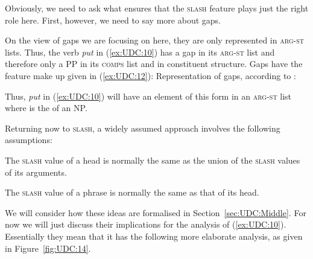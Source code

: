 \documentclass[output=paper
,notxmath 
	        ,collection
	        ,collectionchapter
 	        ,biblatex
                ,babelshorthands
                ,newtxmath
                ,draftmode
                ,colorlinks, citecolor=brown
]{langscibook}
\begin{document}

Obviously, we need to ask what ensures that the \textsc{slash} feature plays just
the right role here. First, however, we need to say more about gaps.

On the view of gaps we are focusing on here, they are only represented in
\textsc{arg-st} lists. Thus, the verb \emph{put} in (\ref{ex:UDC:10})
 has a gap in its
\textsc{arg-st} list and therefore only a PP in its \textsc{comps} list and
in constituent structure. Gaps have the feature make up given in
(\ref{ex:UDC:12}):
\ea
\label{ex:UDC:12}
Representation of gaps, according to \citet[161]{Pollard:Sag:94}:\\
\z  


\noindent
Thus, \emph{put} in (\ref{ex:UDC:10}) will have an element of this
form in an \textsc{arg-st} list where  is the \localv of an
NP.

Returning now to \textsc{slash}, a widely assumed approach involves the following
assumptions:

\eal
\label{ex:UDC:13}
\ex
The \textsc{slash} value of a head is normally the same as the union of the \textsc{slash} values of its
arguments.

\ex
The \textsc{slash} value of a phrase is normally the same as that of its head.
\zl

\noindent
We will consider how these ideas are formalised in
Section~\ref{sec:UDC:Middle}. For now we will just discuss their
implications for the analysis of (\ref{ex:UDC:10}).  Essentially they
mean that it has the following more elaborate analysis, as given in Figure~\ref{fig:UDC:14}.
\end{document}
